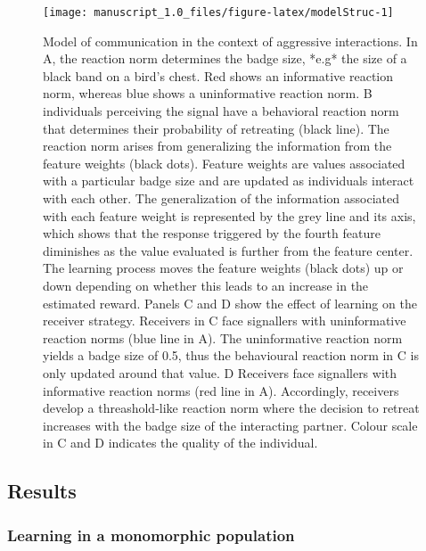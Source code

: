 \documentclass[
  12pt,
]{article}
\begin{document}
\begin{figure}

{\centering \texttt{[image: manuscript\_1.0\_files/figure-latex/modelStruc-1]} 

}

\caption{Model of communication in the context of aggressive interactions. In A, the reaction norm determines the badge size, *e.g* the size of a black band on a bird's chest. Red shows an informative reaction norm, whereas blue shows a uninformative reaction norm. B individuals perceiving the signal have a behavioral reaction norm that determines their probability of retreating (black line). The reaction norm arises from generalizing the information from the feature weights (black dots). Feature weights are values associated with a particular badge size and are updated as individuals interact with each other. The generalization of the information associated with each feature weight is represented by the grey line and its axis, which shows that the response triggered by the fourth feature diminishes as the value evaluated is further from the feature center. The learning process moves the feature weights (black dots) up or down depending on whether this leads to an increase in the estimated reward. Panels C and D show the effect of learning on the receiver strategy. Receivers in C face signallers with uninformative reaction norms (blue line in A). The uninformative reaction norm yields a badge size of 0.5, thus the behavioural reaction norm in C is only updated around that value. D Receivers face signallers with informative reaction norms (red line in A). Accordingly, receivers develop a threashold-like reaction norm where the decision to retreat increases with the badge size of the interacting partner. Colour scale in C and D indicates the quality of the individual.}\label{fig:modelStruc}
\end{figure}

\hypertarget{results}{%
\subsection{Results}\label{results}}

\hypertarget{learning-in-a-monomorphic-population}{%
\subsubsection{Learning in a monomorphic
population}\label{learning-in-a-monomorphic-population}}
\end{document}

